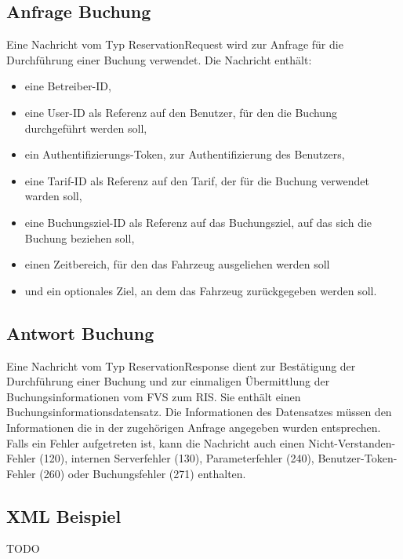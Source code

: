 

\subsection{Anfrage Buchung}
Eine Nachricht vom Typ ReservationRequest wird zur Anfrage für die Durchführung einer Buchung verwendet. Die Nachricht enthält:
\begin{itemize}
\item eine Betreiber-ID,
\item eine User-ID als Referenz auf den Benutzer, für den die Buchung durchgeführt werden soll,
\item ein Authentifizierungs-Token, zur Authentifizierung des Benutzers,
\item eine Tarif-ID als Referenz auf den Tarif, der für die Buchung verwendet warden soll,
\item eine Buchungsziel-ID als Referenz auf das Buchungsziel, auf das sich die Buchung beziehen soll,
\item einen Zeitbereich, für den das Fahrzeug ausgeliehen werden soll
\item und ein optionales Ziel, an dem das Fahrzeug zurückgegeben werden soll.
\end{itemize}



\subsection{Antwort Buchung}
Eine Nachricht vom Typ ReservationResponse dient zur Bestätigung der Durchführung einer Buchung und zur einmaligen Übermittlung der Buchungsinformationen vom FVS zum RIS. Sie enthält einen Buchungsinformationsdatensatz. Die Informationen des Datensatzes müssen den Informationen die in der zugehörigen Anfrage angegeben wurden entsprechen. Falls ein Fehler aufgetreten ist, kann die Nachricht auch einen Nicht-Verstanden-Fehler (120), internen Serverfehler (130), Parameterfehler (240), Benutzer-Token-Fehler (260) oder Buchungsfehler (271) enthalten.



\subsection{XML Beispiel}
TODO